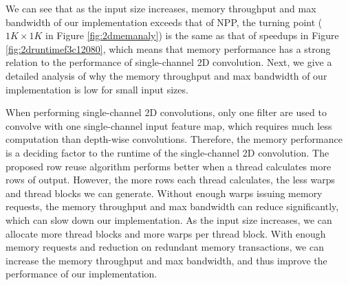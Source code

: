 We can see that as the input size increases, memory throughput and max bandwidth of our implementation exceeds that of NPP, the turning point ($1K \times 1K$ in Figure \ref{fig:2dmemanaly}) is the same as that of speedups in Figure \ref{fig:2druntimef3c12080}, which means that memory performance has a strong relation to the performance of single-channel 2D convolution. Next, we give a detailed analysis of why the memory throughput and max bandwidth of our implementation is low for small input sizes.

When performing single-channel 2D convolutions, only one filter are used to convolve with one single-channel input feature map, which requires much less computation than depth-wise convolutions. Therefore, the memory performance is a deciding factor to the runtime of the single-channel 2D convolution. The proposed row reuse algorithm performs better when a thread calculates more rows of output. However, the more rows each thread calculates, the less warps and thread blocks we can generate. Without enough warps issuing memory requests, the memory throughput and max bandwidth can reduce significantly, which can slow down our implementation. As the input size increases, we can allocate more thread blocks and more warps per thread block. With enough memory requests and reduction on redundant memory transactions, we can increase the memory throughput and max bandwidth, and thus improve the performance of our implementation.


